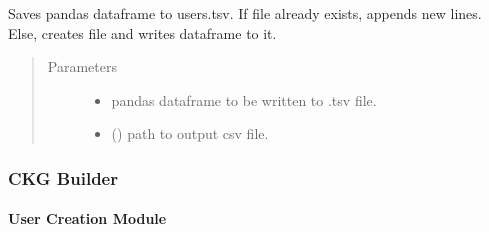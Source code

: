 \documentclass[letterpaper,10pt,english]{sphinxmanual}
\begin{document}
\begin{fulllineitems}
\label{\detokenize{_autosummary/graphdb_builder.users:graphdb_builder.users.users_controller.GenerateGraphFiles}}
Saves pandas dataframe to users.tsv.
If file already exists, appends new lines.     Else, creates file and writes dataframe to it.
\begin{quote}\begin{description}
\item[{Parameters}] \leavevmode\begin{itemize}
\item {} 
 \textendash{} pandas dataframe to be written to .tsv file.

\item {} 
 () \textendash{} path to output csv file.

\end{itemize}

\end{description}\end{quote}

\end{fulllineitems}



\subsubsection{CKG Builder}
\label{\detokenize{_autosummary/graphdb_builder.builder:ckg-builder}}\label{\detokenize{_autosummary/graphdb_builder.builder::doc}}

\paragraph{User Creation Module}
\label{\detokenize{_autosummary/graphdb_builder.builder:module-graphdb_builder.builder.create_user}}\label{\detokenize{_autosummary/graphdb_builder.builder:user-creation-module}}
\end{document}
